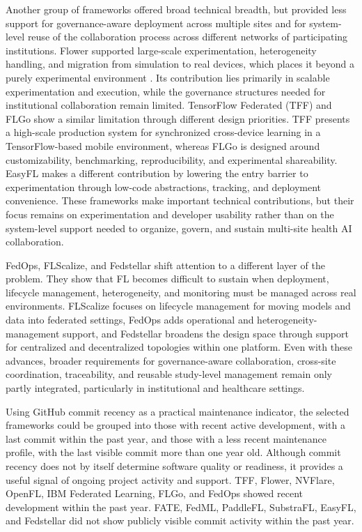 \documentclass[preprint,5p, 10pt, times]{elsarticle}
\begin{document}
Another group of frameworks offered broad technical breadth, but provided less support for governance-aware deployment across multiple sites and for system-level reuse of the collaboration process across different networks of participating institutions.
Flower supported large-scale experimentation, heterogeneity handling, and migration from simulation to real devices, which places it beyond a purely experimental environment \cite{beutel2020flower}. 
Its contribution lies primarily in scalable experimentation and execution, while the governance structures needed for institutional collaboration remain limited.
TensorFlow Federated (TFF) \cite{bonawitz2019towards} and FLGo \cite{wang2023flgo} show a similar limitation through different design priorities. TFF presents a high-scale production system for synchronized cross-device learning in a TensorFlow-based mobile environment, whereas FLGo is designed around customizability, benchmarking, reproducibility, and experimental shareability.
EasyFL makes a different contribution by lowering the entry barrier to experimentation through low-code abstractions, tracking, and deployment convenience\cite{zhuang2022easyfl}. 
These frameworks make important technical contributions, but their focus remains on experimentation and developer usability rather than on the system-level support needed to organize, govern, and sustain multi-site health AI collaboration.

FedOps\cite{moon2024fedops,yang2023flscalize}, FLScalize\cite{beltran2024fedstellar}, and Fedstellar\cite{beltran2024fedstellar} shift attention to a different layer of the problem. They show that FL becomes difficult to sustain when deployment, lifecycle management, heterogeneity, and monitoring must be managed across real environments. FLScalize focuses on lifecycle management for moving models and data into federated settings, FedOps adds operational and heterogeneity-management support, and Fedstellar broadens the design space through support for centralized and decentralized topologies within one platform. Even with these advances, broader requirements for governance-aware collaboration, cross-site coordination, traceability, and reusable study-level management remain only partly integrated, particularly in institutional and healthcare settings. 

Using GitHub commit recency as a practical maintenance indicator, the selected frameworks could be grouped into those with recent active development, with a last commit within the past year, and those with a less recent maintenance profile, with the last visible commit more than one year old. Although commit recency does not by itself determine software quality or readiness, it provides a useful signal of ongoing project activity and support.
TFF, Flower, NVFlare, OpenFL, IBM Federated Learning, FLGo, and FedOps showed recent development within the past year. FATE, FedML, PaddleFL, SubstraFL, EasyFL, and Fedstellar did not show publicly visible commit activity within the past year.
\end{document}
